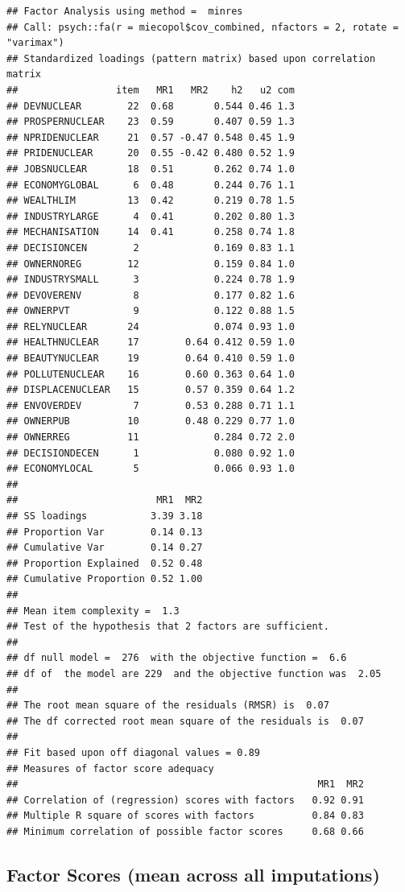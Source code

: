\documentclass[
]{article}
\begin{document}
\begin{verbatim}
## Factor Analysis using method =  minres
## Call: psych::fa(r = miecopol$cov_combined, nfactors = 2, rotate = "varimax")
## Standardized loadings (pattern matrix) based upon correlation matrix
##                 item   MR1   MR2    h2   u2 com
## DEVNUCLEAR        22  0.68       0.544 0.46 1.3
## PROSPERNUCLEAR    23  0.59       0.407 0.59 1.3
## NPRIDENUCLEAR     21  0.57 -0.47 0.548 0.45 1.9
## PRIDENUCLEAR      20  0.55 -0.42 0.480 0.52 1.9
## JOBSNUCLEAR       18  0.51       0.262 0.74 1.0
## ECONOMYGLOBAL      6  0.48       0.244 0.76 1.1
## WEALTHLIM         13  0.42       0.219 0.78 1.5
## INDUSTRYLARGE      4  0.41       0.202 0.80 1.3
## MECHANISATION     14  0.41       0.258 0.74 1.8
## DECISIONCEN        2             0.169 0.83 1.1
## OWNERNOREG        12             0.159 0.84 1.0
## INDUSTRYSMALL      3             0.224 0.78 1.9
## DEVOVERENV         8             0.177 0.82 1.6
## OWNERPVT           9             0.122 0.88 1.5
## RELYNUCLEAR       24             0.074 0.93 1.0
## HEALTHNUCLEAR     17        0.64 0.412 0.59 1.0
## BEAUTYNUCLEAR     19        0.64 0.410 0.59 1.0
## POLLUTENUCLEAR    16        0.60 0.363 0.64 1.0
## DISPLACENUCLEAR   15        0.57 0.359 0.64 1.2
## ENVOVERDEV         7        0.53 0.288 0.71 1.1
## OWNERPUB          10        0.48 0.229 0.77 1.0
## OWNERREG          11             0.284 0.72 2.0
## DECISIONDECEN      1             0.080 0.92 1.0
## ECONOMYLOCAL       5             0.066 0.93 1.0
## 
##                        MR1  MR2
## SS loadings           3.39 3.18
## Proportion Var        0.14 0.13
## Cumulative Var        0.14 0.27
## Proportion Explained  0.52 0.48
## Cumulative Proportion 0.52 1.00
## 
## Mean item complexity =  1.3
## Test of the hypothesis that 2 factors are sufficient.
## 
## df null model =  276  with the objective function =  6.6
## df of  the model are 229  and the objective function was  2.05 
## 
## The root mean square of the residuals (RMSR) is  0.07 
## The df corrected root mean square of the residuals is  0.07 
## 
## Fit based upon off diagonal values = 0.89
## Measures of factor score adequacy             
##                                                    MR1  MR2
## Correlation of (regression) scores with factors   0.92 0.91
## Multiple R square of scores with factors          0.84 0.83
## Minimum correlation of possible factor scores     0.68 0.66
\end{verbatim}

\hypertarget{factor-scores-mean-across-all-imputations}{%
\subsection{Factor Scores (mean across all
imputations)}\label{factor-scores-mean-across-all-imputations}}
\end{document}
